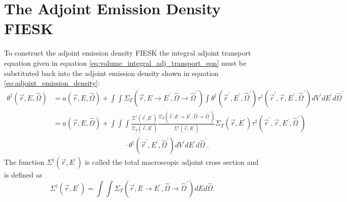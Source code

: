\section{The Adjoint Emission Density FIESK}
To construct the adjoint emission density FIESK the integral adjoint transport
equation given in equation \ref{eq:volume_integral_adj_transport_eqn} must be 
substituted back into the adjoint emission density shown in equation 
\ref{eq:adjoint_emission_density}:
\begin{align}
  \theta^{\dagger}(\vec{r},E,\hat{\Omega}) & = a(\vec{r},E,\hat{\Omega}) +
  \int\int \Sigma_T(\vec{r},E \to E^{'},\hat{\Omega} \to \hat{\Omega}^{'})
  \int \theta^{\dagger}(\vec{r}^{'},E^{'},\hat{\Omega}^{'}) 
  \tau^{\dagger}(\vec{r}^{'},\vec{r},E^{'},\hat{\Omega}^{'}) 
  dV^{'} dE^{'} d\hat{\Omega}^{'} \nonumber \\
  & = a(\vec{r},E,\hat{\Omega}) +
  \int\int\int \frac{\Sigma^{\dagger}(\vec{r},E^{'})}{\Sigma_T(\vec{r},E^{'})}
  \frac{\Sigma_T(\vec{r},E \to E^{'},\hat{\Omega} \to \hat{\Omega}^{'})}
       {\Sigma^{\dagger}(\vec{r},E^{'})} \Sigma_T(\vec{r},E^{'})
  \tau^{\dagger}(\vec{r}^{'},\vec{r},E^{'},\hat{\Omega}^{'}) \nonumber \\
  & \qquad \qquad \qquad \qquad \qquad \cdot
  \theta^{\dagger}(\vec{r}^{'},E^{'},\hat{\Omega}^{'}) 
  dV^{'} dE^{'} d\hat{\Omega}^{'}. \nonumber
\end{align}
The function $\Sigma^{\dagger}(\vec{r},E^{'})$ is called the total macroscopic
adjoint cross section and is defined as
\begin{equation}
  \Sigma^{\dagger}(\vec{r},E^{'}) = \int\int 
  \Sigma_T(\vec{r},E \to E^{'},\hat{\Omega} \to \hat{\Omega}^{'}) 
  dEd\hat{\Omega}.
  \label{eq:total_adjoint_cross_section}
\end{equation}

